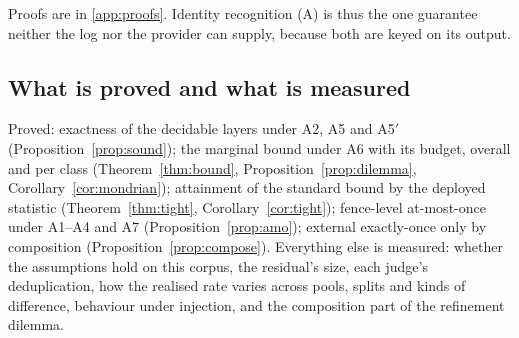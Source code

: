 Proofs are in \ref{app:proofs}. Identity recognition (A) is thus the one guarantee neither the log nor the provider can supply, because both are keyed on its output.

\subsection{What is proved and what is measured}

Proved: exactness of the decidable layers under A2, A5 and A5$'$ (Proposition~\ref{prop:sound}); the marginal bound under A6 with its budget, overall and per class (Theorem~\ref{thm:bound}, Proposition~\ref{prop:dilemma}, Corollary~\ref{cor:mondrian}); attainment of the standard bound by the deployed statistic (Theorem~\ref{thm:tight}, Corollary~\ref{cor:tight}); fence-level at-most-once under A1--A4 and A7 (Proposition~\ref{prop:amo}); external exactly-once only by composition (Proposition~\ref{prop:compose}). Everything else is measured: whether the assumptions hold on this corpus, the residual's size, each judge's deduplication, how the realised rate varies across pools, splits and kinds of difference, behaviour under injection, and the composition part of the refinement dilemma.
